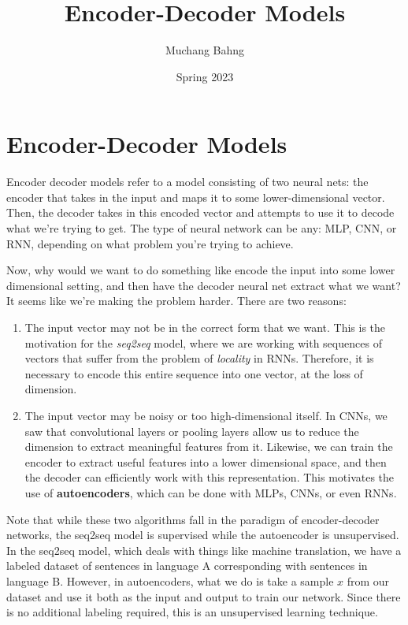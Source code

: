 \documentclass{article}
\begin{document}

\title{Encoder-Decoder Models}
\author{Muchang Bahng}
\date{Spring 2023}

\maketitle
\tableofcontents
\pagebreak 



\section{Encoder-Decoder Models}

  Encoder decoder models refer to a model consisting of two neural nets: the encoder that takes in the input and maps it to some lower-dimensional vector. Then, the decoder takes in this encoded vector and attempts to use it to decode what we're trying to get. The type of neural network can be any: MLP, CNN, or RNN, depending on what problem you're trying to achieve. 

  Now, why would we want to do something like encode the input into some lower dimensional setting, and then have the decoder neural net extract what we want? It seems like we're making the problem harder. There are two reasons: 
  \begin{enumerate}
    \item The input vector may not be in the correct form that we want. This is the motivation for the \textit{seq2seq} model, where we are working with sequences of vectors that suffer from the problem of \textit{locality} in RNNs. Therefore, it is necessary to encode this entire sequence into one vector, at the loss of dimension. 

    \item The input vector may be noisy or too high-dimensional itself. In CNNs, we saw that convolutional layers or pooling layers allow us to reduce the dimension to extract meaningful features from it. Likewise, we can train the encoder to extract useful features into a lower dimensional space, and then the decoder can efficiently work with this representation. This motivates the use of \textbf{autoencoders}, which can be done with MLPs, CNNs, or even RNNs. 
  \end{enumerate}

  Note that while these two algorithms fall in the paradigm of encoder-decoder networks, the seq2seq model is supervised while the autoencoder is unsupervised. In the seq2seq model, which deals with things like machine translation, we have a labeled dataset of sentences in language A corresponding with sentences in language B. However, in autoencoders, what we do is take a sample $x$ from our dataset and use it both as the input and output to train our network. Since there is no additional labeling required, this is an unsupervised learning technique. 
\end{document}
